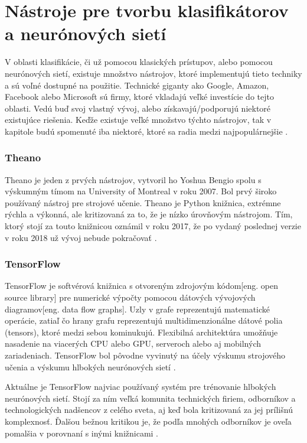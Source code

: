 
\section{Nástroje pre tvorbu klasifikátorov a neurónových sietí}
\label{sec:frameworks}
V oblasti klasifikácie, či už pomocou klasických prístupov, alebo pomocou neurónových sietí, existuje množstvo nástrojov,
    ktoré implementujú tieto techniky a sú voľné dostupné na použitie.
Technické giganty ako Google, Amazon, Facebook alebo Microsoft sú firmy, ktoré vkladajú veľké investície do tejto oblasti.
Vedú buď svoj vlastný vývoj, alebo získavajú/podporujú niektoré existujúce riešenia.
Keďže existuje veľké množstvo týchto nástrojov, tak v kapitole budú spomenuté iba niektoré, ktoré sa radia medzi najpopulárnejšie \cite{odkaz:FrameworkComparison}.

\subsubsection{Theano}
Theano je jeden z prvých nástrojov, vytvoril ho Yoshua Bengio spolu s výskumným tímom na University of Montreal v roku 2007.
Bol prvý široko používaný nástroj pre strojové učenie.
Theano je Python knižnica, extrémne rýchla a výkonná, ale kritizovaná za to, že je nízko úrovňovým nástrojom.
Tím, ktorý stojí za touto knižnicou oznámil v roku 2017, že po vydaný poslednej verzie v roku 2018 už vývoj nebude pokračovať \cite{odkaz:FrameworkComparison}.

\subsubsection{TensorFlow}
TensorFlow je softvérová knižnica s otvoreným zdrojovým kódom[eng. open source library] pre numerické výpočty pomocou dátových vývojových diagramov[eng. data flow graphs].
Uzly v grafe reprezentujú matematické operácie, zatiaľ čo hrany grafu reprezentujú multidimenzionálne dátové polia (tensors), ktoré medzi sebou kominukujú.
Flexibilná architektúra umožňuje nasadenie na viacerých CPU alebo GPU, serveroch alebo aj mobilných zariadeniach.
TensorFlow bol pôvodne vyvinutý na účely výskumu strojového učenia a výskumu hlbokých neurónových sietí \cite{odkaz:TensorFlow}.

Aktuálne je TensorFlow najviac používaný systém pre trénovanie hlbokých neurónových sietí.
Stojí za ním veľká komunita technických firiem, odborníkov a technologických nadšencov z celého sveta, aj keď bola kritizovaná za jej prílišnú komplexnosť.
Ďalšou bežnou kritikou je, že podľa mnohých odborníkov je oveľa pomalšia v porovnaní s inými knižnicami \cite{odkaz:FrameworkComparison}.

